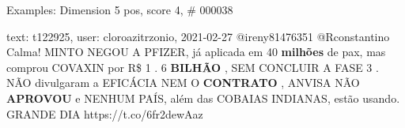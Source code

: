 \begin{frame}{Examples: Dimension 5 pos, score 4, \# 000038}
\footnotesize
\begin{exampleblock}{text: t122925, user: cloroazitrzonio, 2021-02-27}
@ireny81476351 @Rconstantino Calma! MINTO NEGOU A PFIZER, já aplicada em 40 
\textbf{milhões} de pax, mas comprou COVAXIN por R\$ 1 . 6 \textbf{BILHÃO} , 
SEM CONCLUIR A FASE 3 . NÃO divulgaram a EFICÁCIA NEM O \textbf{CONTRATO} , 
ANVISA NÃO \textbf{APROVOU} e NENHUM PAÍS, além das COBAIAS INDIANAS, estão 
usando. GRANDE DIA  
https://t.co/6fr2dewAaz 
\end{exampleblock}
\end{frame}
